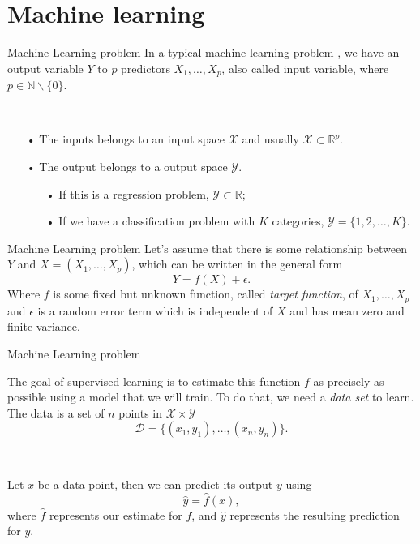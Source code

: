 \documentclass[11pt]{beamer}
\begin{document}
\section{Machine learning}
\begin{frame}{Machine Learning problem}
In a typical machine learning problem \cite{7}, we have an output variable $Y$ to $p$ predictors $X_1,\dots, X_p$, also called input variable, where $p\in \mathbb{N}\backslash \{0\}$. 

~
\begin{itemize}
\item[•] The inputs belongs to an input space $\mathcal{X}$ and usually $\mathcal{X} \subset \mathbb{R}^p$. 

\item[•] The output belongs to a output space $\mathcal{Y}$. 
\begin{itemize}
\item[•] If this is a regression problem, $\mathcal{Y} \subset \mathbb{R}$;
\item[•] If we have a classification problem with $K$ categories, $\mathcal{Y} = \{1,2,\dots, K\}$.
\end{itemize}
\end{itemize}


\end{frame}

\begin{frame}{Machine Learning problem}
Let's assume that there is some relationship between $Y$ and $X = (X_1,\dots, X_p)$, which can be written in the general form
$$
Y = f(X) + \epsilon.
$$
Where $f$ is some fixed but unknown function, called \textit{target function}, of $X_1, \dots, X_p$ and $\epsilon$ is a random error term which is independent of $X$ and has mean zero and finite variance.

\end{frame}

\begin{frame}{Machine Learning problem}

The goal of supervised learning is to estimate this function $f$ as precisely as possible using a model that we will train. To do that, we need a \textit{data set} to learn. The data is a set of $n$ points in $\mathcal{X} \times \mathcal{Y}$
$$
\mathcal{D} = \{(x_1, y_1),\dots, (x_n,y_n)\}.
$$

~

Let $x$ be a data point, then we can predict its output $y$ using 
$$
\hat{y} = \hat{f}(x),
$$
where $\hat{f}$ represents our estimate for $f$, and $\hat{y}$ represents the resulting prediction for $y$.
\end{frame}
\end{document}
